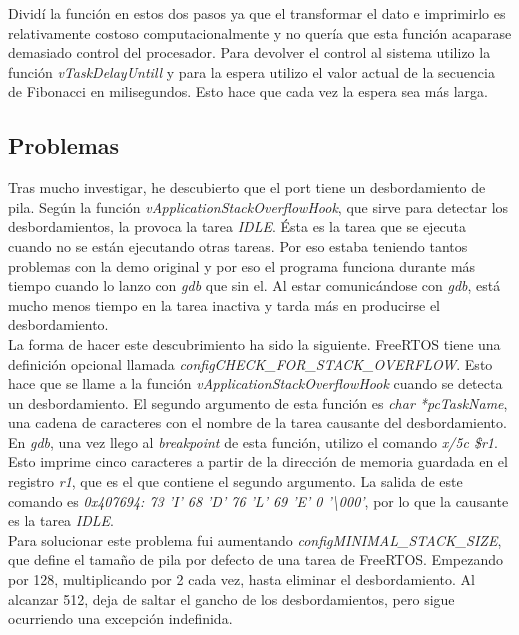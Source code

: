 Dividí la función en estos dos pasos ya que el transformar el dato e imprimirlo es relativamente costoso computacionalmente y no quería que esta función acaparase demasiado control del procesador. Para devolver el control al sistema utilizo la función \emph{vTaskDelayUntill} y para la espera utilizo el valor actual de la secuencia de Fibonacci en milisegundos. Esto hace que cada vez la espera sea más larga.\\

\subsection{Problemas}
\label{ssec:Problemas}
Tras mucho investigar, he descubierto que el port tiene un desbordamiento de pila. Según la función \emph{vApplicationStackOverflowHook}, que sirve para detectar los desbordamientos, la provoca la tarea \emph{IDLE}. Ésta es la tarea que se ejecuta cuando no se están ejecutando otras tareas. Por eso estaba teniendo tantos problemas con la demo original y por eso el programa funciona durante más tiempo cuando lo lanzo con \emph{gdb} que sin el. Al estar comunicándose con \emph{gdb}, está mucho menos tiempo en la tarea inactiva y tarda más en producirse el desbordamiento.\\

La forma de hacer este descubrimiento ha sido la siguiente. FreeRTOS tiene una definición opcional llamada \emph{configCHECK\_FOR\_STACK\_OVERFLOW}. Esto hace que se llame a la función \emph{vApplicationStackOverflowHook} cuando se detecta un desbordamiento. El segundo argumento de esta función es \emph{char *pcTaskName}, una cadena de caracteres con el nombre de la tarea causante del desbordamiento. En \emph{gdb}, una vez llego al \emph{breakpoint} de esta función, utilizo el comando \emph{x/5c \$r1}. Esto imprime cinco caracteres a partir de la dirección de memoria guardada en el registro \emph{r1}, que es el que contiene el segundo argumento. La salida de este comando es \emph{0x407694:       73 'I'  68 'D'  76 'L'  69 'E'  0 '\textbackslash000'}, por lo que la causante es la tarea \emph{IDLE}.\\

Para solucionar este problema fui aumentando \emph{configMINIMAL\_STACK\_SIZE}, que define el tamaño de pila por defecto de una tarea de FreeRTOS. Empezando por 128, multiplicando por 2 cada vez, hasta eliminar el desbordamiento. Al alcanzar 512, deja de saltar el gancho de los desbordamientos, pero sigue ocurriendo una excepción indefinida.

